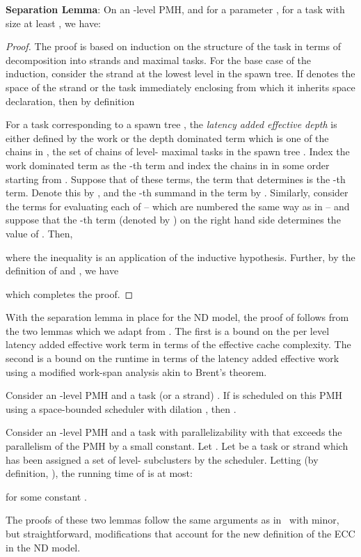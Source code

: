 \begin{lemma}
\textbf{Separation Lemma}: On an -level PMH, and for a parameter
, for a task  with size at least , we have:

\label{lemma:lvl-decomp}
\end{lemma}
\begin{proof}
  The proof is based on induction on the structure of the task
in terms of decomposition into strands and maximal tasks.
  For the base case of the induction, consider the strand  at the
  lowest level in the spawn tree. If  denotes the space of the
  strand or the task immediately enclosing  from which it
  inherits space declaration, then by
  definition 

For a task  corresponding to a spawn tree , the \emph{latency
added effective depth}
 is either
defined by the work or the depth dominated term which is one of the
chains in , the set of chains of level- maximal
tasks in the spawn tree .  Index the work dominated term as the
-th term and index the chains in  in some order
starting from .  Suppose that of these terms, the term that
determines 
is the -th term. Denote this by , and the -th summand in
the term by .  Similarly, consider the terms for evaluating
each of  -- which are numbered the same way as in
 -- and suppose that the -th term (denoted by
) on the right hand side determines the value of
.  Then,


where the inequality is an application of the inductive hypothesis.
Further, by the definition of   and , we have


  which completes the proof.
\end{proof}
With the separation lemma in place for the ND model, the proof of
 follows from the two lemmas which we adapt from
\cite{BlellochFiGi11}. The first is a bound on the per level latency
added effective work term in terms of the effective cache complexity.
The second is a bound on the runtime in terms of the latency added
effective work using a modified work-span analysis akin to
 Brent's theorem.

\begin{lemma}
  Consider an -level PMH and a task (or a strand) . 
  If  is scheduled on this PMH using a space-bounded
  scheduler with dilation , then
.
  \label{lemma:leveldecompapp}
\end{lemma}
\begin{lemma}
  Consider an -level PMH and a task with parallelizability with
   that exceeds the parallelism of the PMH by a small
  constant. Let .
  Let  be a task or strand which has been
  assigned a set  of 
  level- subclusters by the scheduler. Letting  (by definition, ), the running time of  is at most:

for some constant .
  \label{lem:runtime}
\end{lemma}
The proofs of these two lemmas follow the same arguments as
in~\cite{BlellochFiGi11} with minor, but straightforward, modifications
that account for the new definition of the ECC in the ND model.

